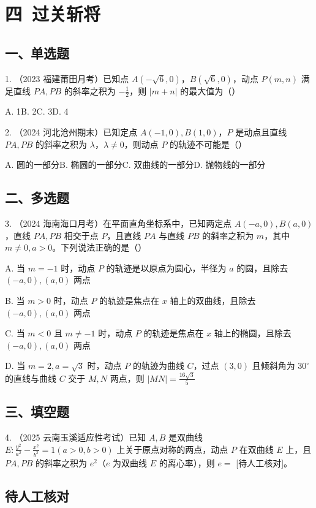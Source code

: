 \documentclass[UTF8,a4paper,11pt]{ctexart}
\begin{document}
\section*{四\ 过关斩将}
\subsection*{一、单选题}
1. （2023 福建莆田月考）已知点 $A(-\sqrt{6},0)$，$B(\sqrt{6},0)$，动点 $P(m,n)$ 满足直线 $PA,PB$ 的斜率之积为 $-\frac{1}{2}$，则 $|m+n|$ 的最大值为\hfill（\quad）

A. 1\qquad B. 2\qquad C. 3\qquad D. 4

2. （2024 河北沧州期末）已知定点 $A(-1,0),B(1,0)$，$P$ 是动点且直线 $PA,PB$ 的斜率之积为 $\lambda$，$\lambda\ne 0$，则动点 $P$ 的轨迹不可能是\hfill（\quad）

A. 圆的一部分\qquad B. 椭圆的一部分\qquad C. 双曲线的一部分\qquad D. 抛物线的一部分

\subsection*{二、多选题}
3. （2024 海南海口月考）在平面直角坐标系中，已知两定点 $A(-a,0),B(a,0)$，直线 $PA,PB$ 相交于点 $P$，且直线 $PA$ 与直线 $PB$ 的斜率之积为 $m$，其中 $m\ne 0,a>0$。下列说法正确的是\hfill（\quad）

A. 当 $m=-1$ 时，动点 $P$ 的轨迹是以原点为圆心，半径为 $a$ 的圆，且除去 $(-a,0),(a,0)$ 两点

B. 当 $m>0$ 时，动点 $P$ 的轨迹是焦点在 $x$ 轴上的双曲线，且除去 $(-a,0),(a,0)$ 两点

C. 当 $m<0$ 且 $m\ne -1$ 时，动点 $P$ 的轨迹是焦点在 $x$ 轴上的椭圆，且除去 $(-a,0),(a,0)$ 两点

D. 当 $m=2,a=\sqrt{3}$ 时，动点 $P$ 的轨迹为曲线 $C$，过点 $(3,0)$ 且倾斜角为 $30^\circ$ 的直线与曲线 $C$ 交于 $M,N$ 两点，则 $|MN|=\frac{16\sqrt{3}}{5}$

\subsection*{三、填空题}
4. （2025 云南玉溪适应性考试）已知 $A,B$ 是双曲线 $E:\frac{y^2}{a^2}-\frac{x^2}{b^2}=1(a>0,b>0)$ 上关于原点对称的两点，动点 $P$ 在双曲线 $E$ 上，且 $PA,PB$ 的斜率之积为 $e^2$（$e$ 为双曲线 $E$ 的离心率），则 $e=$ [待人工核对]。

\subsection*{待人工核对}
\end{document}
